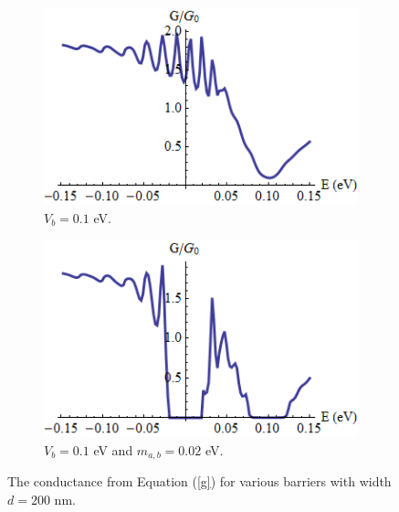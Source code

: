 \begin{figure}
	\begin{subfigure}{0.45\textwidth}
		\centerline{\includegraphics[scale=0.6]{images/rectangular-barrier-conductance-a}}
		\caption{$V_{b}=0.1$ eV.}
	\end{subfigure}
	\hspace{1.2cm}
	\begin{subfigure}{0.45\textwidth}
		\centerline{\includegraphics[scale=0.6]{images/rectangular-barrier-conductance-b}}
		\caption{$V_{b}=0.1$ eV and $m_{a,b}=0.02$ eV.}
	\end{subfigure}
	\caption{The conductance from Equation (\ref{g}) for various barriers with width $d=200$ nm.}
	\label{rectangular-barrier-conductance-a}
\end{figure}

